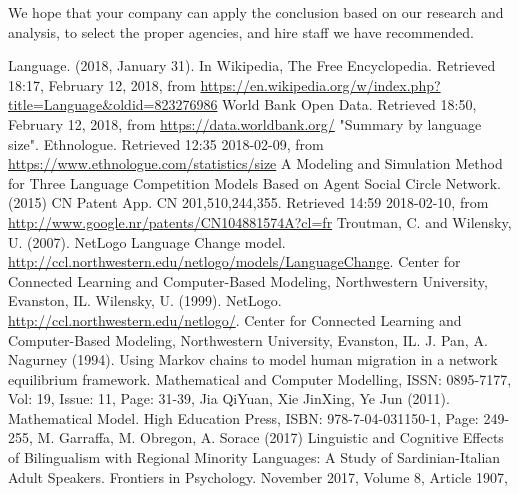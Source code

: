 \documentclass{mcmthesis}
\begin{document}
\hspace*{8mm}We hope that your company can apply the conclusion based on our research and analysis, to select the proper agencies, and hire staff we have recommended.
\newpage
\begin{thebibliography}{99}
 Language. (2018, January 31). In Wikipedia, The Free Encyclopedia. Retrieved 18:17, February 12, 2018, from \url{https://en.wikipedia.org/w/index.php?title=Language&oldid=823276986}
 World Bank Open Data. Retrieved 18:50, February 12, 2018, from \url{https://data.worldbank.org/} 
 "Summary by language size". Ethnologue. Retrieved 12:35 2018-02-09, from \url{https://www.ethnologue.com/statistics/size}
 A Modeling and Simulation Method for Three Language Competition Models Based on Agent Social Circle Network.(2015) CN Patent App. CN 201,510,244,355. Retrieved 14:59 2018-02-10, from \url{http://www.google.nr/patents/CN104881574A?cl=fr}
 Troutman, C. and Wilensky, U. (2007). NetLogo Language Change model. \url{http://ccl.northwestern.edu/netlogo/models/LanguageChange}. Center for Connected Learning and Computer-Based Modeling, Northwestern University, Evanston, IL.
 Wilensky, U. (1999). NetLogo. \url{http://ccl.northwestern.edu/netlogo/}. Center for Connected Learning and Computer-Based Modeling, Northwestern University, Evanston, IL.
 J. Pan, A. Nagurney (1994). Using Markov chains to model human migration in a network equilibrium framework. Mathematical and Computer Modelling, ISSN: 0895-7177, Vol: 19, Issue: 11, Page: 31-39,
 Jia QiYuan, Xie JinXing, Ye Jun (2011). Mathematical Model. High Education Press, ISBN: 978-7-04-031150-1, Page: 249-255,
 M. Garraffa, M. Obregon, A. Sorace (2017) Linguistic and Cognitive Effects of
Bilingualism with Regional Minority Languages: A Study of Sardinian-Italian Adult Speakers. Frontiers in Psychology. November 2017, Volume 8, Article 1907,
\end{thebibliography}
\end{document}

